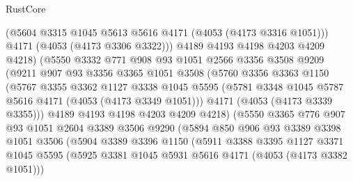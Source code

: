 \begin{lexlean}{RustCore}
\begin{coremodule}
                        (@5604 @3315 @1045 @5613 @5616 @4171 (@4053 (@4173 @3316 @1051)))
                        @4171
                        (@4053 (@4173 @3306 @3322)))
                      @4189
                      @4193
                      @4198
                      @4203
                      @4209
                      @4218)
                    (@5550
                      @3332
                      @771
                      @908
                      @93
                      @1051
                      @2566
                      @3356
                      @3508
                      @9209
                      (@9211
                        @907
                        @93
                        @3356
                        @3365
                        @1051
                        @3508
                        (@5760
                          @3356
                          @3363
                          @1150
                          (@5767
                            @3355
                            @3362
                            @1127
                            @3338
                            @1045
                            @5595
                            (@5781 @3348 @1045 @5787 @5616 @4171 (@4053 (@4173 @3349 @1051)))
                            @4171
                            (@4053 (@4173 @3339 @3355)))
                          @4189
                          @4193
                          @4198
                          @4203
                          @4209
                          @4218)
                        (@5550
                          @3365
                          @776
                          @907
                          @93
                          @1051
                          @2604
                          @3389
                          @3506
                          @9290
                          (@5894
                            @850
                            @906
                            @93
                            @3389
                            @3398
                            @1051
                            @3506
                            (@5904
                              @3389
                              @3396
                              @1150
                              (@5911
                                @3388
                                @3395
                                @1127
                                @3371
                                @1045
                                @5595
                                (@5925 @3381 @1045 @5931 @5616 @4171 (@4053 (@4173 @3382 @1051)))

\end{coremodule}
\end{lexlean}
